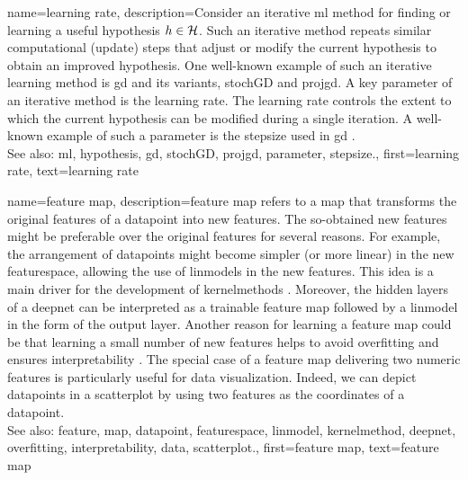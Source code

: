 {name={learning rate}, 
	description={Consider 
		an iterative \gls{ml} method for finding or learning a useful \gls{hypothesis} $h \in \mathcal{H}$. 
		Such an iterative method repeats similar computational (update) steps that adjust or 
		modify the current \gls{hypothesis} to obtain an improved \gls{hypothesis}. One 
		well-known example of such an iterative learning method is \gls{gd} and its variants, \gls{stochGD} and 
		\gls{projgd}. A key \gls{parameter} of an iterative method is the learning rate. 
		The learning rate controls the extent to which the current \gls{hypothesis} 
		can be modified during a single iteration. A well-known example of such a \gls{parameter} 
		is the \gls{stepsize} used in \gls{gd} \cite[Ch. 5]{MLBasics}.
				\\
		See also: \gls{ml}, \gls{hypothesis}, \gls{gd}, \gls{stochGD}, \gls{projgd}, \gls{parameter}, \gls{stepsize}.},
	first={learning rate},
	text={learning rate} 
}

{name={feature map}, 
	description={\Gls{feature} \gls{map} refers to a \gls{map} 
		that transforms the original \glspl{feature} of a \gls{datapoint} into new \glspl{feature}. The 
		so-obtained new \glspl{feature} might be preferable over the original \glspl{feature} for 
		several reasons. For example, the arrangement of \glspl{datapoint} might become 
		simpler (or more linear) in the new \gls{featurespace}, allowing the use of \glspl{linmodel} 
		in the new \glspl{feature}. This idea is a main driver for the development of \glspl{kernelmethod} \cite{LearningKernelsBook}. 
		Moreover, the hidden layers of a \gls{deepnet} can be interpreted as a trainable \gls{feature} \gls{map} 
		followed by a \gls{linmodel} in the form of the output layer. Another reason for learning a \gls{feature} \gls{map}
		could be that learning a small number of new \glspl{feature} helps to avoid \gls{overfitting} and 
		ensures \gls{interpretability} \cite{Ribeiro2016}. The special case of a \gls{feature} \gls{map} delivering 
		two numeric \glspl{feature} is particularly useful for \gls{data} visualization. Indeed, we can depict 
		\glspl{datapoint} in a \gls{scatterplot} by using two \glspl{feature} as the coordinates of a \gls{datapoint}.
				\\
		See also: \gls{feature}, \gls{map}, \gls{datapoint}, \gls{featurespace}, \gls{linmodel}, \gls{kernelmethod}, \gls{deepnet}, \gls{overfitting}, \gls{interpretability}, \gls{data}, \gls{scatterplot}.},
	first={feature map},
	text={feature map} 
}
	
